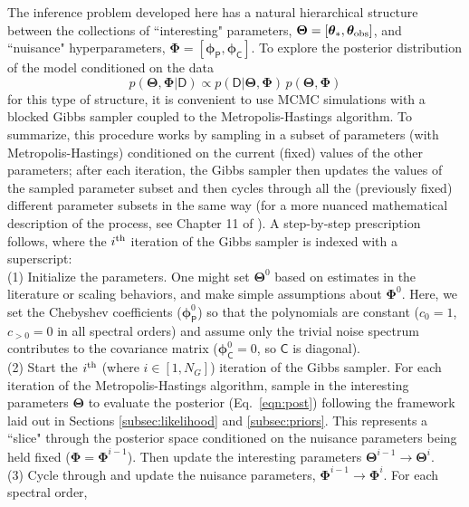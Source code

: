 \documentclass[iop,floatfix]{emulateapj}
\newcommand{\vD}{\mathsf{D}}
\newcommand{\vC}{\mathsf{C}}
\newcommand{\vt}{ {\bm \theta}}
\newcommand{\vT}{ {\bm \Theta}}
\newcommand{\vp}{ {\bm \phi}}
\newcommand{\vP}{ {\bm \Phi}}
\newcommand{\cheb}{ \vp_{\mathsf{P}}}
\newcommand{\cov}{ \vp_{\mathsf{C}}}
\begin{document}
The inference problem developed here has a natural hierarchical structure between the collections 
of ``interesting" parameters, $\vT = [\vt_{\ast}, \vt_{\rm obs}]$, and ``nuisance" hyperparameters, 
$\vP = [\cheb, \cov]$.  To explore the posterior distribution of the model conditioned on the data
\begin{equation} \label{eqn:post}
p(\vT, \vP | \vD) \propto p(\vD | \vT, \vP) \, p(\vT, \vP)
\end{equation}
for this type of structure, it is convenient to use MCMC simulations with a blocked Gibbs 
sampler coupled to the Metropolis-Hastings algorithm.  To summarize, this procedure works by 
sampling in a subset of parameters (with Metropolis-Hastings) conditioned on the current (fixed) 
values of the other parameters; after each iteration, the Gibbs sampler then updates the values of 
the sampled parameter subset and then cycles through all the (previously fixed) different parameter 
subsets in the same way (for a more nuanced mathematical description of the process, see Chapter 11 
of \citealt{gelman13}).  A step-by-step prescription follows, where the $i^{\rm th}$ 
iteration of the Gibbs sampler is indexed with a superscript: \\

\noindent (1) Initialize the parameters.  One might set $\vT^0$ based on estimates in the 
literature or scaling behaviors, and make simple assumptions about $\vP^0$.  Here, we set the 
Chebyshev coefficients ($\cheb^0$) so that the polynomials are constant ($c_0 = 1$,  $c_{>0} = 0$ 
in all spectral orders) and assume only the trivial noise spectrum contributes to the covariance 
matrix ($\cov^0 = 0$, so $\vC$ is diagonal).  \\

\noindent (2) Start the $i^{\rm th}$ (where $i \in [1,N_G]$) iteration of the Gibbs sampler.  For 
each iteration of the Metropolis-Hastings algorithm, sample in the interesting parameters $\vT$ to 
evaluate the posterior (Eq.~\ref{eqn:post}) following the framework laid out in Sections 
\ref{subsec:likelihood} and \ref{subsec:priors}.  This represents a ``slice" through the posterior 
space conditioned on the nuisance parameters being held fixed ($\vP = \vP^{i-1}$).  Then update the 
interesting parameters $\vT^{i-1} \rightarrow \vT^i$. \\

\noindent (3) Cycle through and update the nuisance parameters, $\vP^{i-1} \rightarrow \vP^i$.  For 
each spectral order,   
\end{document}
